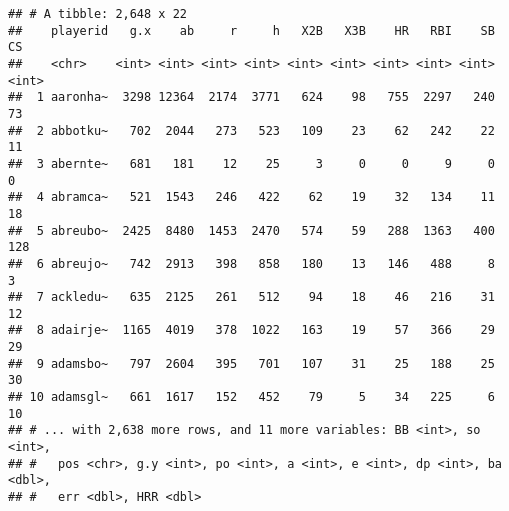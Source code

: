 \documentclass[]{book}
\newenvironment{Shaded}{\begin{snugshade}}{\end{snugshade}}
\newcommand{\KeywordTok}[1]{\textcolor[rgb]{0.13,0.29,0.53}{\textbf{#1}}}
\newcommand{\DecValTok}[1]{\textcolor[rgb]{0.00,0.00,0.81}{#1}}
\newcommand{\StringTok}[1]{\textcolor[rgb]{0.31,0.60,0.02}{#1}}
\newcommand{\ControlFlowTok}[1]{\textcolor[rgb]{0.13,0.29,0.53}{\textbf{#1}}}
\newcommand{\OperatorTok}[1]{\textcolor[rgb]{0.81,0.36,0.00}{\textbf{#1}}}
\newcommand{\NormalTok}[1]{#1}
\begin{document}
\begin{Shaded}
\end{Shaded}

\begin{verbatim}
## # A tibble: 2,648 x 22
##    playerid   g.x    ab     r     h   X2B   X3B    HR   RBI    SB    CS
##    <chr>    <int> <int> <int> <int> <int> <int> <int> <int> <int> <int>
##  1 aaronha~  3298 12364  2174  3771   624    98   755  2297   240    73
##  2 abbotku~   702  2044   273   523   109    23    62   242    22    11
##  3 abernte~   681   181    12    25     3     0     0     9     0     0
##  4 abramca~   521  1543   246   422    62    19    32   134    11    18
##  5 abreubo~  2425  8480  1453  2470   574    59   288  1363   400   128
##  6 abreujo~   742  2913   398   858   180    13   146   488     8     3
##  7 ackledu~   635  2125   261   512    94    18    46   216    31    12
##  8 adairje~  1165  4019   378  1022   163    19    57   366    29    29
##  9 adamsbo~   797  2604   395   701   107    31    25   188    25    30
## 10 adamsgl~   661  1617   152   452    79     5    34   225     6    10
## # ... with 2,638 more rows, and 11 more variables: BB <int>, so <int>,
## #   pos <chr>, g.y <int>, po <int>, a <int>, e <int>, dp <int>, ba <dbl>,
## #   err <dbl>, HRR <dbl>
\end{verbatim}

\begin{Shaded}
\end{Shaded}
\end{document}
